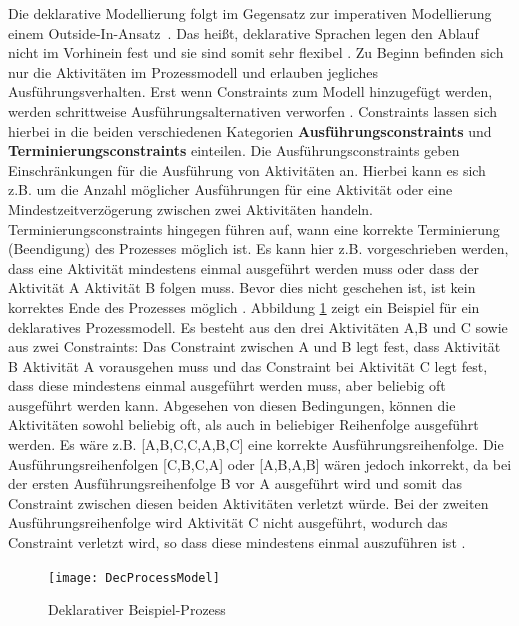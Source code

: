  Die deklarative Modellierung folgt im Gegensatz zur imperativen Modellierung einem \grqq Outside-In-Ansatz\grqq \ \cite{lichtenegger2012}. Das heißt, deklarative Sprachen legen den Ablauf nicht im Vorhinein fest \cite{pichler2012} und sie sind somit sehr flexibel \cite{reichert2012}. Zu Beginn befinden sich nur die Aktivitäten im Prozessmodell und erlauben jegliches Ausführungsverhalten. Erst wenn Constraints zum Modell hinzugefügt werden, werden schrittweise Ausführungsalternativen verworfen \cite{pichler2012}. Constraints lassen sich hierbei in die beiden verschiedenen Kategorien \textbf{Ausführungsconstraints} und \textbf{Terminierungsconstraints} einteilen. Die Ausführungsconstraints geben Einschränkungen für die Ausführung von Aktivitäten an. Hierbei kann es sich z.B. um die Anzahl möglicher Ausführungen für eine Aktivität oder eine Mindestzeitverzögerung zwischen zwei Aktivitäten handeln. Terminierungsconstraints hingegen führen auf, wann eine korrekte Terminierung (Beendigung) des Prozesses möglich ist. Es kann hier z.B. vorgeschrieben werden, dass eine Aktivität mindestens einmal ausgeführt werden muss oder dass der Aktivität A Aktivität B folgen muss. Bevor dies nicht geschehen ist, ist kein korrektes Ende des Prozesses möglich \cite{reichert2012}.  Abbildung \ref{fig:Dec} zeigt ein Beispiel für ein deklaratives Prozessmodell. Es besteht aus den drei Aktivitäten A,B und C sowie aus zwei Constraints:  Das Constraint zwischen A und B legt fest, dass Aktivität B Aktivität A vorausgehen muss und das Constraint bei Aktivität C legt fest, dass diese mindestens einmal ausgeführt werden muss, aber beliebig oft ausgeführt werden kann. Abgesehen von diesen Bedingungen, können die Aktivitäten sowohl beliebig oft, als auch in beliebiger Reihenfolge ausgeführt werden. Es wäre z.B. [A,B,C,C,A,B,C] eine korrekte Ausführungsreihenfolge. Die Ausführungsreihenfolgen [C,B,C,A] oder [A,B,A,B] wären jedoch inkorrekt, da bei der ersten Ausführungsreihenfolge B vor A ausgeführt wird und somit das Constraint zwischen diesen beiden Aktivitäten verletzt würde. Bei der zweiten Ausführungsreihenfolge wird Aktivität C nicht ausgeführt, wodurch das Constraint verletzt wird, so dass diese mindestens einmal auszuführen ist \cite{reichert2012}. \newline

\begin{figure}[H]
\begin{center}
  \texttt{[image: DecProcessModel]} %
  \caption{Deklarativer Beispiel-Prozess \cite{pesic2006}}
  \label{fig:Dec}
\end{center}
\end{figure} 

